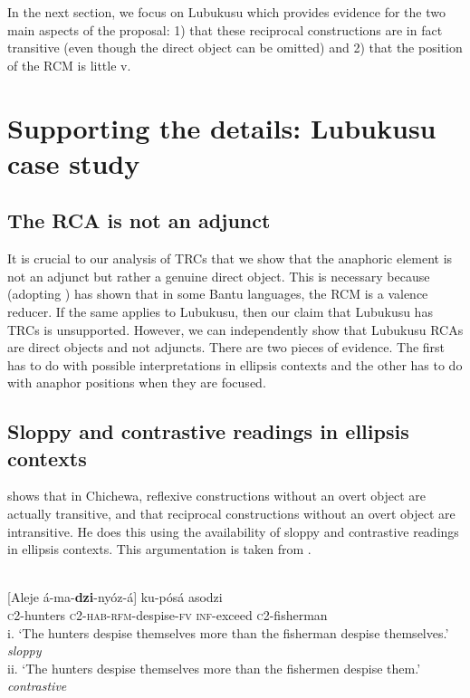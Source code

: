 \documentclass[output=paper]{langsci/langscibook}
\begin{document}
In the next section, we focus on Lubukusu which provides evidence for the two main aspects of the proposal: 1) that these reciprocal constructions are in fact transitive (even though the direct object can be omitted) and 2) that the position of the RCM is little v.

\section{Supporting the details: Lubukusu case study}\label{sec:safir:4}
\subsection{The RCA is not an adjunct}

It is crucial to our analysis of TRCs that we show that the anaphoric element is not an adjunct but rather a genuine direct object. This is necessary because \citet{Mchombo2004} (adopting \citealt{ReinhartReuland1993}) has shown that in some Bantu languages, the RCM is a valence reducer. If the same applies to Lubukusu, then our claim that Lubukusu has TRCs is unsupported. However, we can independently show that Lubukusu RCAs are direct objects and not adjuncts. There are two pieces of evidence. The first has to do with possible interpretations in ellipsis contexts and the other has to do with anaphor positions when they are focused.

\subsection{Sloppy and contrastive readings in ellipsis contexts}

\citet[106]{Mchombo2004} shows that in Chichewa, reflexive constructions without an overt object are actually transitive, and that reciprocal constructions without an overt object are intransitive. He does this using the availability of sloppy and contrastive readings in ellipsis contexts. This argumentation is taken from \citet{SellsEtAl1987}.



\ea\label{ex:safir:11}
\\
\gll {}[Aleje    á-ma-\textbf{{dzi}}{-nyóz-á}] ku-pósá   asodzi \\
  \textsc{c}2-hunters   \textsc{c2-hab-}\textsc{rfm}-despise-\textsc{fv}   \textsc{inf}-exceed   \textsc{c}2-fisherman\\
\glt i. ‘The hunters despise themselves more than the fisherman despise themselves.’ \textit{sloppy} \\
\glt ii. ‘The hunters despise themselves more than the fishermen despise them.’    \textit{contrastive}
\z
\end{document}

